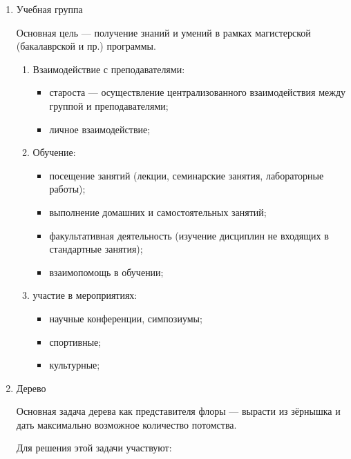 \documentclass[10pt]{article}
\begin{document}
\begin{enumerate}
\begin{enumerate}
  \item{Учебная группа}

    Основная цель --- получение знаний и умений в рамках магистерской (бакалаврской и пр.) программы.

    \begin{enumerate}
    \item{Взаимодействие с преподавателями:}
      \begin{itemize}
      \item{староста --- осуществление централизованного взаимодействия между группой и преподавателями;}
      \item{личное взаимодействие;}
      \end{itemize}
    \item{Обучение:}
      \begin{itemize}
      \item{посещение занятий (лекции, семинарские занятия, лабораторные работы);}
      \item{выполнение домашних и самостоятельных занятий;}
      \item{факультативная деятельность (изучение дисциплин не входящих в стандартные занятия);}
      \item{взаимопомощь в обучении;}
      \end{itemize}
    \item{участие в мероприятиях:}
      \begin{itemize}
      \item{научные конференции, симпозиумы;}
      \item{спортивные;}
      \item{культурные;}
      \end{itemize}
    \end{enumerate}
    
  \item{Дерево}

    Основная задача дерева как представителя флоры --- вырасти из зёрнышка и дать максимально возможное количество потомства.

    Для решения этой задачи участвуют:


\end{enumerate}
\end{enumerate}
\end{document}
